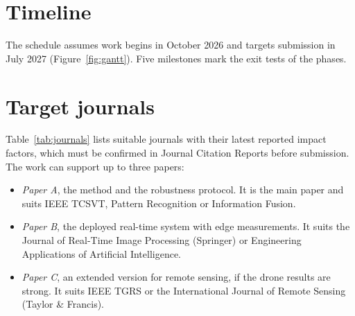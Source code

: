 \section{Timeline}

The schedule assumes work begins in October 2026 and targets submission in
July 2027 (Figure~\ref{fig:gantt}). Five milestones mark the exit tests of
the phases.



\section{Target journals}
\label{sec:journals}

Table~\ref{tab:journals} lists suitable journals with their latest
reported impact factors, which must be confirmed in Journal Citation Reports
before submission. The work can support up to three papers:
\begin{itemize}
  \item \emph{Paper A}, the method and the robustness protocol. It is the
        main paper and suits IEEE TCSVT, Pattern Recognition or Information
        Fusion.
  \item \emph{Paper B}, the deployed real-time system with edge
        measurements. It suits the Journal of Real-Time Image Processing
        (Springer) or Engineering Applications of Artificial Intelligence.
  \item \emph{Paper C}, an extended version for remote sensing, if the
        drone results are strong. It suits IEEE TGRS or the International
        Journal of Remote Sensing (Taylor \& Francis).
\end{itemize}

